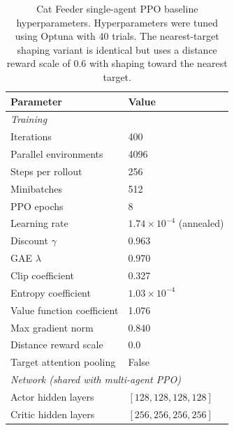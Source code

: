 \begin{table}[h]
\caption{Cat Feeder single-agent PPO baseline hyperparameters. Hyperparameters were tuned using Optuna with 40 trials. The nearest-target shaping variant is identical but uses a distance reward scale of 0.6 with shaping toward the nearest target.}
\label{tab:cat-feeder-ppo-hparams}
\centering
\begin{tabular}{ll}
\toprule
Parameter & Value \\
\midrule
\multicolumn{2}{l}{\textit{Training}} \\
Iterations & 400 \\
Parallel environments & 4096 \\
Steps per rollout & 256 \\
Minibatches & 512 \\
PPO epochs & 8 \\
Learning rate & $1.74 \times 10^{-4}$ (annealed) \\
Discount $\gamma$ & 0.963 \\
GAE $\lambda$ & 0.970 \\
Clip coefficient & 0.327 \\
Entropy coefficient & $1.03 \times 10^{-4}$ \\
Value function coefficient & 1.076 \\
Max gradient norm & 0.840 \\
Distance reward scale & 0.0 \\
Target attention pooling & False \\
\midrule
\multicolumn{2}{l}{\textit{Network (shared with multi-agent PPO)}} \\
Actor hidden layers & $[128, 128, 128, 128]$ \\
Critic hidden layers & $[256, 256, 256, 256]$ \\
\bottomrule
\end{tabular}
\end{table}

